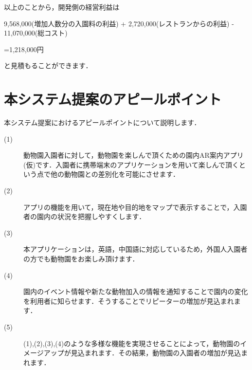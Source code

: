 \documentclass[a4j]{jarticle}
\begin{document}
以上のことから，開発側の経営利益は
\begin{screen}
\begin{center}
9,568,000(増加人数分の入園料の利益) + 2,720,000(レストランからの利益) - 11,070,000(総コスト)
\end{center}
\begin{flushright}
=1,218,000円
\end{flushright}
\end{screen}
と見積もることができます．
\section{本システム提案のアピールポイント}
本システム提案におけるアピールポイントについて説明します．
\begin{description}
\item[(1)  ] 動物園入園者に対して，動物園を楽しんで頂くための園内AR案内アプリ(仮)です．入園者に携帯端末のアプリケーションを用いて楽しんで頂くという点で他の動物園との差別化を可能にさせます．
\item[(2)  ] アプリの機能を用いて，現在地や目的地をマップで表示することで，入園者の園内の状況を把握しやすくします．
\item[(3)  ] 本アプリケーションは，英語，中国語に対応しているため，外国人入園者の方でも動物園をお楽しみ頂けます．
\item[(4)  ] 園内のイベント情報や新たな動物加入の情報を通知することで園内の変化を利用者に知らせます．そうすることでリピーターの増加が見込まれます．
\item[(5)  ] (1),(2),(3),(4)のような多様な機能を実現させることによって，動物園のイメージアップが見込まれます．その結果，動物園の入園者の増加が見込まれます．
\end{description}
\end{document}
